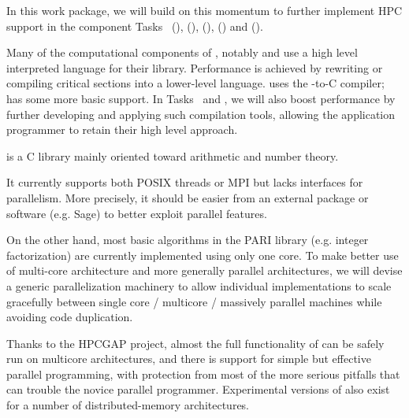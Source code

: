 \begin{workpackage}
\begin{wpdescription}
  In this work package, we will build on this momentum to further implement HPC support in
  the component Tasks~ (\Pari), (\GAP),
   (\Linbox), (\MPIR) and
   (\Singular).
  
  Many of the computational components of \TheProject, notably \Sage
  and \GAP use a high level
  interpreted language for their library. Performance is achieved by
  rewriting or compiling critical sections into a lower-level
  language. \Sage uses
  the \Cython \Python-to-C compiler; \GAP has some more basic support.
  In Tasks~ and , we will also boost performance by
  further developing and applying such compilation tools, allowing the
  application programmer to retain their high level approach.

\end{wpdescription}
\begin{tasklist}
\begin{task}[title=PARI,id=hpc-pari,PM=20, lead=UB,wphases=0-48!0.5]
  \Pari is a C library mainly oriented toward arithmetic and number theory.
  
  It currently supports both POSIX threads or MPI but lacks interfaces for
  parallelism. More precisely, it should be easier from an external package
  or software (e.g. Sage) to better exploit \Pari parallel features.

  On the other hand, most basic algorithms in the PARI library (e.g. integer
  factorization) are currently implemented using only one core. To
  make better use of multi-core architecture and more generally parallel
  architectures, we will devise a generic parallelization machinery
  to allow individual implementations to scale gracefully between single
  core / multicore / massively parallel machines while avoiding code
  duplication.
\end{task}


\begin{task}[title=GAP,id=hpc-gap,PM=18, lead=SA, wphases={0-48!0.375}]
  Thanks to the HPCGAP project, almost the full functionality of \GAP
  can be safely run on multicore architectures, and there is support for
  simple but effective parallel programming, with protection from most
  of the more serious pitfalls that can trouble the novice parallel
  programmer. Experimental versions of \GAP also exist for a number of
  distributed-memory architectures.



\end{task}
\end{tasklist}
\end{workpackage}
